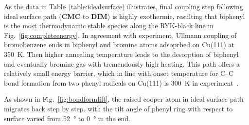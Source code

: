\documentclass[%
 reprint,
 amsmath,amssymb,
 aps,
prb,
floatfix,
]{revtex4-2}
\newcommand{\zhzh}{\color{blue}}
\newcommand{\zhzh}{\color{blue}}
\newcommand{\comm}{\color{Purple}} %
\begin{document}
{\zhzh
As the data in Table~\ref{table:idealsurface} illustrates, final coupling step following ideal surface path (\textbf{CMC} to \textbf{DIM}) is highly exothermic, resulting that biphenyl is the most thermodynamic stable species along the RYK-black line in Fig.~\ref{fig:completeenergy}. In agreement with experiment, Ullmann coupling of bromobenzene ends in biphenyl and bromine atoms adsoprbed on Cu(111) at \SI{350}{\kelvin}\cite{ullmann_67}. Then higher annealing temperature leads to the desorption of biphenyl and eventually bromine gas with tremendously high heating.
This path offers a relatively small energy barrier, which in line with onset temperature for C--C bond formation from two phenyl radicals on Cu(111) is \SI{300}{\kelvin} in experiment~\cite{sur_sci01}.

As shown in Fig.~\ref{fig:bondformlift}, the raised cooper atom in ideal surface path migrates back step by step. with the tilt angle of phenyl ring with respect to surface varied from \SI{52}{\degree} to \SI{0}{\degree} in the end.
 

 
}

\end{document}
